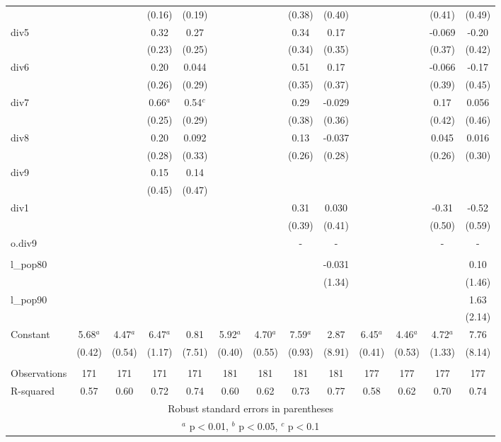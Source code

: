 \documentclass[]{article}
\begin{document}
\begin{tabular}{lcccccccccccc}
 &  &  & (0.16) & (0.19) &  &  & (0.38) & (0.40) &  &  & (0.41) & (0.49) \\
div5 &  &  & 0.32 & 0.27 &  &  & 0.34 & 0.17 &  &  & -0.069 & -0.20 \\
 &  &  & (0.23) & (0.25) &  &  & (0.34) & (0.35) &  &  & (0.37) & (0.42) \\
div6 &  &  & 0.20 & 0.044 &  &  & 0.51 & 0.17 &  &  & -0.066 & -0.17 \\
 &  &  & (0.26) & (0.29) &  &  & (0.35) & (0.37) &  &  & (0.39) & (0.45) \\
div7 &  &  & 0.66$^a$ & 0.54$^c$ &  &  & 0.29 & -0.029 &  &  & 0.17 & 0.056 \\
 &  &  & (0.25) & (0.29) &  &  & (0.38) & (0.36) &  &  & (0.42) & (0.46) \\
div8 &  &  & 0.20 & 0.092 &  &  & 0.13 & -0.037 &  &  & 0.045 & 0.016 \\
 &  &  & (0.28) & (0.33) &  &  & (0.26) & (0.28) &  &  & (0.26) & (0.30) \\
div9 &  &  & 0.15 & 0.14 &  &  &  &  &  &  &  &  \\
 &  &  & (0.45) & (0.47) &  &  &  &  &  &  &  &  \\
div1 &  &  &  &  &  &  & 0.31 & 0.030 &  &  & -0.31 & -0.52 \\
 &  &  &  &  &  &  & (0.39) & (0.41) &  &  & (0.50) & (0.59) \\
o.div9 &  &  &  &  &  &  & - & - &  &  & - & - \\
 &  &  &  &  &  &  &  &  &  &  &  &  \\
l\_pop80 &  &  &  &  &  &  &  & -0.031 &  &  &  & 0.10 \\
 &  &  &  &  &  &  &  & (1.34) &  &  &  & (1.46) \\
l\_pop90 &  &  &  &  &  &  &  &  &  &  &  & 1.63 \\
 &  &  &  &  &  &  &  &  &  &  &  & (2.14) \\
Constant & 5.68$^a$ & 4.47$^a$ & 6.47$^a$ & 0.81 & 5.92$^a$ & 4.70$^a$ & 7.59$^a$ & 2.87 & 6.45$^a$ & 4.46$^a$ & 4.72$^a$ & 7.76 \\
 & (0.42) & (0.54) & (1.17) & (7.51) & (0.40) & (0.55) & (0.93) & (8.91) & (0.41) & (0.53) & (1.33) & (8.14) \\
 &  &  &  &  &  &  &  &  &  &  &  &  \\
Observations & 171 & 171 & 171 & 171 & 181 & 181 & 181 & 181 & 177 & 177 & 177 & 177 \\
 R-squared & 0.57 & 0.60 & 0.72 & 0.74 & 0.60 & 0.62 & 0.73 & 0.77 & 0.58 & 0.62 & 0.70 & 0.74 \\ \hline
\multicolumn{13}{c}{ Robust standard errors in parentheses} \\
\multicolumn{13}{c}{ $^a$ p$<$0.01, $^b$ p$<$0.05, $^c$ p$<$0.1} \\
\end{tabular}
\end{document}
